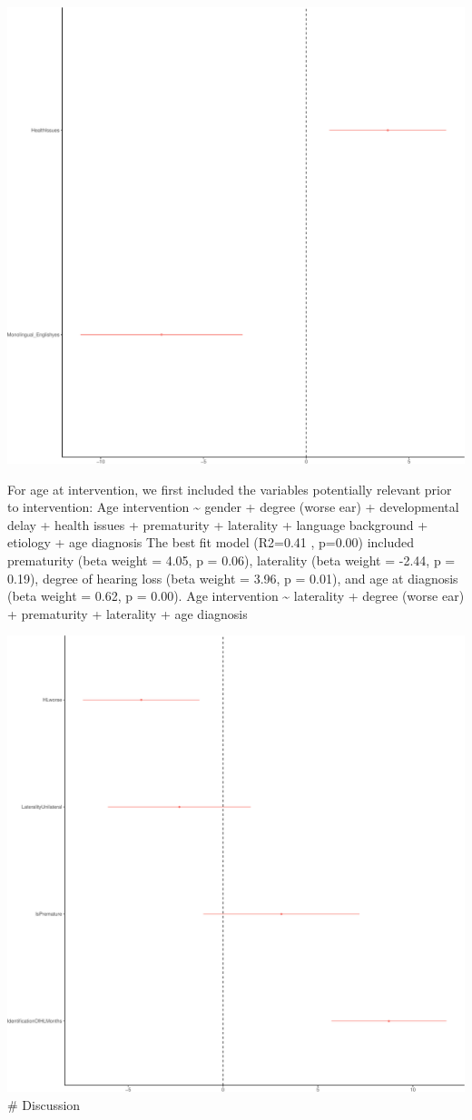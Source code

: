 \documentclass[english,man]{apa6}
\begin{document}
\includegraphics{ELSSP_paper_files/figure-latex/diagnosis-betas-1.pdf}

For age at intervention, we first included the variables potentially relevant prior to intervention:
Age intervention \textasciitilde{} gender + degree (worse ear) + developmental delay + health issues + prematurity + laterality + language background + etiology + age diagnosis
The best fit model (R2=0.41 , p=0.00) included prematurity (beta weight = 4.05, p = 0.06), laterality (beta weight = -2.44, p = 0.19), degree of hearing loss (beta weight = 3.96, p = 0.01), and age at diagnosis (beta weight = 0.62, p = 0.00).
Age intervention \textasciitilde{} laterality + degree (worse ear) + prematurity + laterality + age diagnosis

\includegraphics{ELSSP_paper_files/figure-latex/intervention-betas-1.pdf}
\# Discussion
\end{document}
